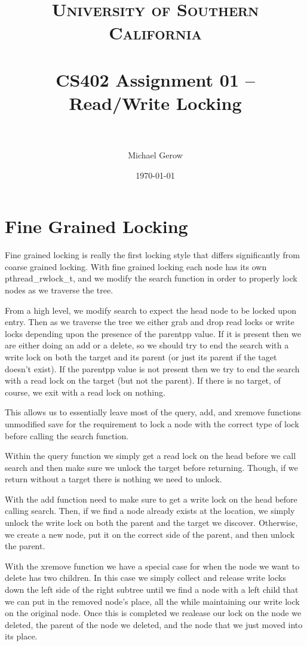 \documentclass[paper=a4, fontsize=11pt]{scrartcl} %
\title{	
\normalfont \normalsize 
\textsc{University of Southern California} \\ [25pt] %
\horrule{0.5pt} \\[0.4cm] %
\huge CS402 Assignment 01 -- Read/Write Locking \\ %
\horrule{2pt} \\[0.5cm] %
}
\author{Michael Gerow} %
\date{\normalsize\today} %
\numberwithin{equation}{section} %
\numberwithin{figure}{section} %
\numberwithin{table}{section} %
\begin{document}
\maketitle %


\section{Fine Grained Locking}
Fine grained locking is really the first locking style that differs significantly from coarse grained locking. With fine grained locking each node has its own pthread\_rwlock\_t, and we modify the search function in order to properly lock nodes as we traverse the tree.

From a high level, we modify search to expect the head node to be locked upon entry. Then as we traverse the tree we either grab and drop read locks or write locks depending upon the presence of the parentpp value.  If it is present then we are either doing an add or a delete, so we should try to end the search with a write lock on both the target and its parent (or just its parent if the taget doesn't exist).  If the parentpp value is not present then we try to end the search with a read lock on the target (but not the parent).  If there is no target, of course, we exit with a read lock on nothing.

This allows us to essentially leave most of the query, add, and xremove functions unmodified save for the requirement to lock a node with the correct type of lock before calling the search function.

Within the query function we simply get a read lock on the head before we call search and then make sure we unlock the target before returning.  Though, if we return without a target there is nothing we need to unlock.

With the add function need to make sure to get a write lock on the head before calling search.  Then, if we find a node already exists at the location, we simply unlock the write lock on both the parent and the target we discover.  Otherwise, we create a new node, put it on the correct side of the parent, and then unlock the parent.

With the xremove function we have a special case for when the node we want to delete has two children.  In this case we simply collect and release write locks down the left side of the right subtree until we find a node with a left child that we can put in the removed node's place, all the while maintaining our write lock on the original node.  Once this is completed we realease our lock on the node we deleted, the parent of the node we deleted, and the node that we just moved into its place. 
\end{document}
